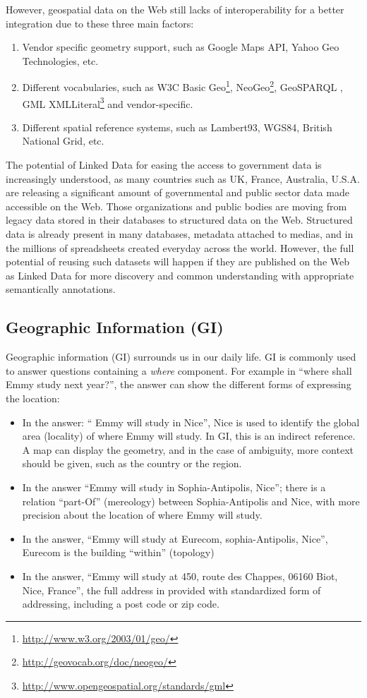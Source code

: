  
However, geospatial data on the Web still lacks of interoperability for a better integration due to these three main factors:
\begin{enumerate}
\item Vendor specific geometry support, such as Google Maps API, Yahoo Geo Technologies, etc.
\item Different vocabularies, such as W3C Basic Geo\footnote{\url{http://www.w3.org/2003/01/geo/}}, NeoGeo\footnote{\url{http://geovocab.org/doc/neogeo/}}, GeoSPARQL  \cite{ogc2012}, GML XMLLiteral\footnote{\url{http://www.opengeospatial.org/standards/gml}} and vendor-specific.
\item Different spatial reference systems, such as Lambert93, WGS84, British National Grid, etc.
\end{enumerate}


The potential of Linked Data for easing the access to government data is increasingly understood, as many countries such as UK, France, Australia, U.S.A. are releasing a significant amount of governmental and public sector data made accessible on the Web. Those organizations and public bodies are moving from legacy data stored in their databases to structured data on the Web. Structured data is already present in many databases, metadata attached to medias, and in the millions of spreadsheets created everyday across the world. However, the full potential of reusing such datasets will happen if they are published on the Web as Linked Data for more discovery and common understanding with appropriate semantically annotations.

\subsection{Geographic Information (GI)}
\label{sec:geoinfo}

Geographic information (GI) surrounds us in our daily life. GI is commonly used to answer questions containing a \textit{where} component. For example in ``where shall Emmy study next year?'', the answer can show the different forms of expressing the location:

\begin{itemize}
\item In the answer: `` Emmy will study in Nice'', Nice is used to identify the global area (locality) of where Emmy will study. In GI, this is an indirect reference. A map can display the geometry, and in the case of ambiguity, more context should be given, such as the country or the region.  
 \item In the answer ``Emmy will study in Sophia-Antipolis, Nice''; there is a relation ``part-Of'' (mereology) between Sophia-Antipolis and Nice, with more precision about the location of where Emmy will study.
 \item In the answer, ``Emmy will study at Eurecom, sophia-Antipolis, Nice'', Eurecom is the building ``within'' (topology)
 \item In the answer, ``Emmy will study at 450, route des Chappes, 06160 Biot, Nice, France'', the full address in provided with  standardized form of addressing, including a post code or zip code.
\end{itemize}
  
